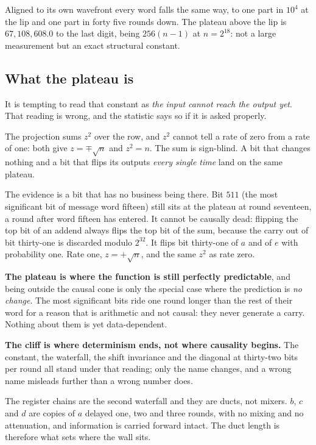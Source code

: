 Aligned to its own wavefront every word falls the same way, to one part in \(10^{4}\) at the lip and
one part in forty five rounds down. The plateau above the lip is \(67{,}108{,}608.0\) to the last
digit, being \(256(n-1)\) at \(n = 2^{18}\): not a large measurement but an exact structural
constant.

\subsection{What the plateau is}

It is tempting to read that constant as \emph{the input cannot reach the output yet}. That reading
is wrong, and the statistic says so if it is asked properly.

The projection sums \(z^{2}\) over the row, and \(z^{2}\) cannot tell a rate of zero from a rate of
one: both give \(z = \mp\sqrt{n}\) and \(z^{2} = n\). The sum is sign-blind. A bit that changes
nothing and a bit that flips its outputs \emph{every single time} land on the same plateau.

The evidence is a bit that has no business being there. Bit \(511\) (the most significant bit of
message word fifteen) still sits at the plateau at round seventeen, a round after word fifteen
has entered. It cannot be causally dead: flipping the top bit of an addend always flips the top bit
of the sum, because the carry out of bit thirty-one is discarded modulo \(2^{32}\). It flips bit
thirty-one of \(a\) and of \(e\) with probability one. Rate one, \(z = +\sqrt{n}\), and the same
\(z^{2}\) as rate zero.

\textbf{The plateau is where the function is still perfectly predictable}, and being outside the
causal cone is only the special case where the prediction is \emph{no change}. The most significant
bits ride one round longer than the rest of their word for a reason that is arithmetic and not
causal: they never generate a carry. Nothing about them is yet data-dependent.

\textbf{The cliff is where determinism ends, not where causality begins.} The constant, the
waterfall, the shift invariance and the diagonal at thirty-two bits per round all stand under that
reading; only the name changes, and a wrong name misleads further than a wrong number does.

The register chains are the second waterfall and they are ducts, not mixers. \(b\), \(c\)
and \(d\) are copies of \(a\) delayed one, two and three rounds, with no mixing and no attenuation,
and information is carried forward intact. The duct length is therefore what sets where the wall
sits.

